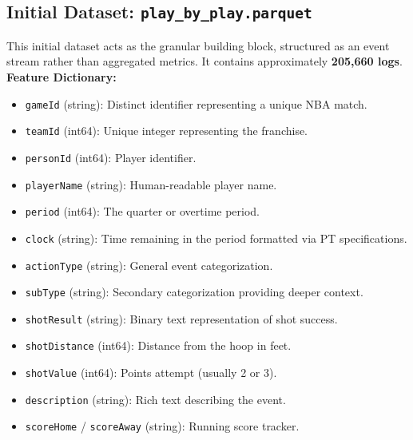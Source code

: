 \documentclass[12pt,a4paper]{article}
\begin{document}
\subsection{Initial Dataset: \texttt{play\_by\_play.parquet}}
This initial dataset acts as the granular building block, structured as an event stream rather than aggregated metrics. It contains approximately \textbf{205,660 logs}.\\
\textbf{Feature Dictionary:}
\begin{itemize}
    \item \texttt{gameId} (string): Distinct identifier representing a unique NBA match.
    \item \texttt{teamId} (int64): Unique integer representing the franchise.
    \item \texttt{personId} (int64): Player identifier.
    \item \texttt{playerName} (string): Human-readable player name.
    \item \texttt{period} (int64): The quarter or overtime period.
    \item \texttt{clock} (string): Time remaining in the period formatted via PT specifications.
    \item \texttt{actionType} (string): General event categorization.
    \item \texttt{subType} (string): Secondary categorization providing deeper context.
    \item \texttt{shotResult} (string): Binary text representation of shot success.
    \item \texttt{shotDistance} (int64): Distance from the hoop in feet.
    \item \texttt{shotValue} (int64): Points attempt (usually 2 or 3).
    \item \texttt{description} (string): Rich text describing the event.
    \item \texttt{scoreHome} / \texttt{scoreAway} (string): Running score tracker.
\end{itemize}
\end{document}

